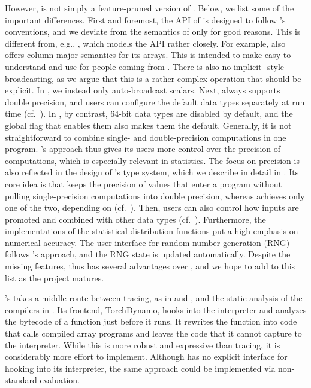 \documentclass[article,shortnames]{jss}
\begin{document}
However,  is not simply a feature-pruned version of .
Below, we list some of the important differences.
First and foremost, the API of  is designed to follow 's conventions, and we deviate from the semantics of   only for good reasons.
This is different from, e.g., , which models the  API rather closely.
For example,  also offers column-major semantics for its arrays.
This is intended to make  easy to understand and use for people coming from .
There is also no implicit -style broadcasting, as we argue that this is a rather complex operation that should be explicit.
In , we instead only auto-broadcast scalars.
Next,  always supports double precision, and users can configure the default data types separately at run time (cf.~).
In , by contrast, 64-bit data types are disabled by default, and the global flag  that enables them also makes them the default.
Generally, it is not straightforward to combine single- and double-precision computations in one program.
's approach thus gives its users more control over the precision of computations, which is especially relevant in statistics.
The focus on precision is also reflected in the design of 's type system, which we describe in detail in .
Its core idea is that  keeps the precision of  values that enter a program without pulling single-precision computations into double precision, whereas  achieves only one of the two, depending on  (cf.~).
Then, users can also control how inputs are promoted and combined with other data types (cf.~).
Furthermore, the implementations of the statistical distribution functions put a high emphasis on numerical accuracy.
The user interface for random number generation (RNG) follows 's approach, and the RNG state is updated automatically.
Despite the missing features,  thus has several advantages over , and we hope to add to this list as the project matures.

's  \citep{ref-ansel2024pytorch} takes a middle route between tracing, as in  and , and the static analysis of the compilers in .
Its frontend, TorchDynamo, hooks into the  interpreter and analyzes the bytecode of a function just before it runs.
It rewrites the function into  code that calls compiled array programs and leaves the code that it cannot capture to the interpreter.
While this is more robust and expressive than tracing, it is considerably more effort to implement.
Although  has no explicit interface for hooking into its interpreter, the same approach could be implemented via non-standard evaluation.
\end{document}
